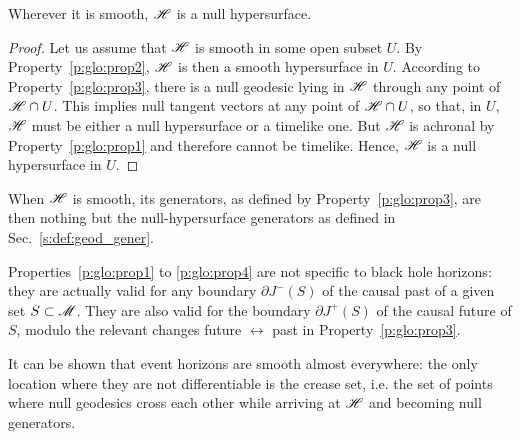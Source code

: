 \begin{prop}
\label{p:glo:prop4}
Wherever it is smooth, $\mathscr{H}$ is a null hypersurface.
\end{prop}

\begin{proof}
Let us assume that $\mathscr{H}$ is smooth in some open subset $U$.
By Property~\ref{p:glo:prop2}, $\mathscr{H}$ is then a smooth hypersurface in $U$.
According to Property~\ref{p:glo:prop3}, there is a null geodesic lying in $\mathscr{H}$ through
any point of $\mathscr{H}\cap U$.
This implies null tangent vectors at any point of $\mathscr{H}\cap U$, so that, in $U$,
$\mathscr{H}$ must be either a null hypersurface or a timelike one. But $\mathscr{H}$ is achronal by Property~\ref{p:glo:prop1} and therefore cannot be timelike. Hence, $\mathscr{H}$ is a null hypersurface in $U$.
\end{proof}
When $\mathscr{H}$ is smooth, its generators,
as defined by Property~\ref{p:glo:prop3}, are then nothing but the
null-hypersurface generators as defined in Sec.~\ref{s:def:geod_gener}.

\begin{remark}
Properties~\ref{p:glo:prop1} to \ref{p:glo:prop4} are not specific to black hole horizons: they are actually
valid for any boundary $\partial J^-(S)$ of the causal past of a given set $S\subset\mathscr{M}$.
They are also valid for the boundary $\partial J^+(S)$ of the causal future of
$S$, modulo the relevant changes future $\leftrightarrow$ past in Property~\ref{p:glo:prop3}.
\end{remark}

It can be shown that event horizons are smooth almost everywhere: the only
location where they are not differentiable is the crease set, i.e. the set of points
where null geodesics cross each other while arriving at $\mathscr{H}$ and becoming null
generators.

